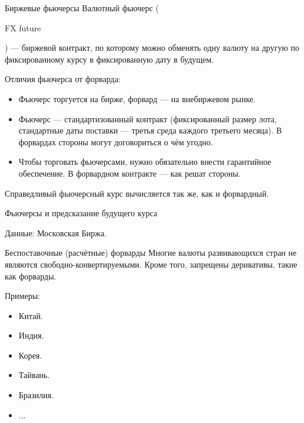 \documentclass{beamer}
\newcommand{\en}[1]{\begin{otherlanguage}{english}#1\end{otherlanguage}}
\begin{document}
\begin{frame}{Биржевые фьючерсы}
\justify
\alert{Валютный фьючерс} (\en{FX future}) --- биржевой контракт, по которому можно обменять одну валюту на другую по фиксированному курсу в фиксированную дату в будущем.

\justify
Отличия фьючерса от форварда:
\begin{itemize}
\justifying
\item Фьючерс торгуется на бирже, форвард --- на внебиржевом рынке.
\item Фьючерс --- стандартизованный контракт (фиксированный размер лота, стандартные даты поставки --- третья среда каждого третьего месяца). В форвардах стороны могут договориться о чём угодно.
\item Чтобы торговать фьючерсами, нужно обязательно внести гарантийное обеспечение. В форвардном контракте --- как решат стороны.
\end{itemize}

\justify
Справедливый фьючерсный курс вычисляется так же, как и форвардный.
\end{frame}



\begin{frame}{Фьючерсы и предсказание будущего курса}
\center
{}

\scriptsize Данные: Московская Биржа.
\end{frame}



\begin{frame}{Беспоставочные (расчётные) форварды}
\justify
Многие валюты развивающихся стран не являются свободно-конвертируемыми. Кроме того, запрещены деривативы, такие как форварды.

\justify
Примеры:
\begin{itemize}
\item Китай.
\item Индия.
\item Корея.
\item Тайвань.
\item Бразилия.
\item ...
\end{itemize}
\end{frame}
\end{document}
